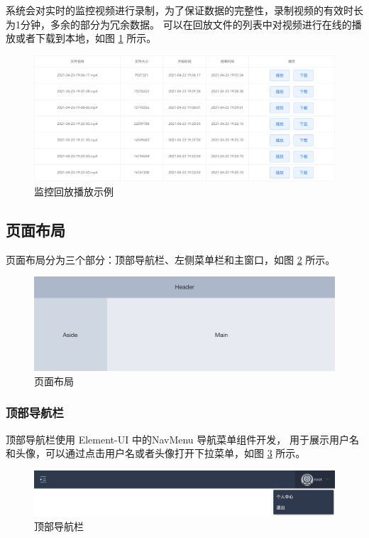系统会对实时的监控视频进行录制，为了保证数据的完整性，录制视频的有效时长为1分钟，多余的部分为冗余数据。
可以在回放文件的列表中对视频进行在线的播放或者下载到本地，如图 \ref{Fig:file_list} 所示。

\begin{figure}[ht]
    \centering
    \includegraphics[width=0.8\linewidth]{./Figure/IMG_file_list.png}
    \caption{监控回放播放示例}\label{Fig:file_list}
\end{figure}

\newpage
\subsection{页面布局}
页面布局分为三个部分：顶部导航栏、左侧菜单栏和主窗口，如图 \ref{Fig:layout} 所示。

\begin{figure}[ht]
    \centering
    \includegraphics[width=0.8\linewidth]{./Figure/IMG_layout.png}
    \caption{页面布局}\label{Fig:layout}
\end{figure}

\subsubsection{顶部导航栏}
顶部导航栏使用 Element-UI 中的NavMenu 导航菜单组件开发，
用于展示用户名和头像，可以通过点击用户名或者头像打开下拉菜单，如图 \ref{Fig:top} 所示。

\begin{figure}[ht]
    \centering
    \includegraphics[width=0.9\linewidth]{./Figure/IMG_top.png}
    \caption{顶部导航栏}\label{Fig:top}
\end{figure}

